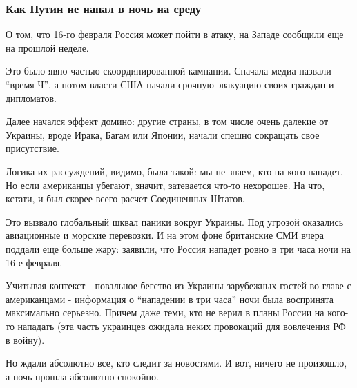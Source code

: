  
 
 
 
 

\subsubsection{Как Путин не напал в ночь на среду}

О том, что 16-го февраля Россия может пойти в атаку, на Западе сообщили еще на
прошлой неделе.

Это было явно частью скоординированной кампании. Сначала медиа назвали \enquote{время
Ч}, а потом власти США начали срочную эвакуацию своих граждан и дипломатов. 

Далее начался эффект домино: другие страны, в том числе очень далекие от
Украины, вроде Ирака, Багам или Японии, начали спешно сокращать свое
присутствие.

Логика их рассуждений, видимо, была такой: мы не знаем, кто на кого нападет. Но
если американцы убегают, значит, затевается что-то нехорошее. На что, кстати, и
был скорее всего расчет Соединенных Штатов. 

Это вызвало глобальный шквал паники вокруг Украины. Под угрозой оказались
авиационные и морские перевозки. И на этом фоне британские СМИ вчера поддали
еще больше жару: заявили, что Россия нападет ровно в три часа ночи на 16-е
февраля. 

Учитывая контекст - повальное бегство из Украины зарубежных гостей во главе с
американцами - информация о \enquote{нападении в три часа} ночи была воспринята
максимально серьезно. Причем даже теми, кто не верил в планы России на кого-то
нападать (эта часть украинцев ожидала неких провокаций для вовлечения РФ в
войну). 

Но ждали абсолютно все, кто следит за новостями. И вот, ничего не произошло, а
ночь прошла абсолютно спокойно. 

